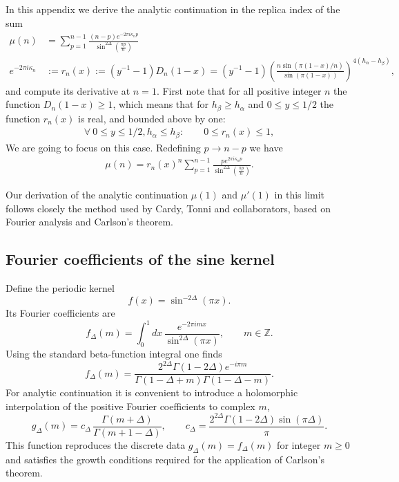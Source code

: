 \documentclass[11pt]{article}
\newcommand{\nn}{\nonumber}
\newcommand{\lb}{\left(}
\newcommand{\rb}{\right)}
\begin{document}
In this appendix we derive the analytic continuation in the replica index
of the sum
\begin{align}
\mu(n)&=\sum_{p=1}^{n-1}\frac{(n-p)e^{-2\pi i \kappa_n p}}{\sin^{2\Delta}\!\left(\frac{\pi p}{n}\right)}\nn\\
e^{-2\pi i \kappa_n}&:=r_n(x):=(y^{-1}-1)D_n(1-x)=(y^{-1}-1)\lb\frac{n\sin(\pi (1-x)/n)}{\sin(\pi (1-x))} \rb^{4(h_\alpha-h_\beta)},
\end{align}
and compute its derivative at $n=1$. First note that for all positive integer $n$ the function $D_n(1-x)\geq 1$, which means that for $h_\beta\geq h_\alpha$ and $0\leq y\leq 1/2$ the function $r_n(x)$ is real, and bounded above by one:
\begin{align}
  \forall\: 0\leq y\leq 1/2, h_\alpha\leq h_\beta: \qquad 0\leq r_n(x)\leq 1,   
\end{align}
We are going to focus on this case. Redefining $p\to n-p$ we have
\begin{align}
\mu(n)=r_n(x)^{n}\sum_{p=1}^{n-1}\frac{p e^{2\pi i \kappa_n p}}{\sin^{2\Delta}\left(\frac{\pi p}{n}\right)}.
\end{align}


Our derivation of the analytic continuation $\mu(1)$ and $\mu'(1)$ in this limit follows closely the
method used by Cardy, Tonni and collaborators\cite{calabrese2011entanglement}, based on Fourier analysis
and Carlson's theorem.

\subsection{Fourier coefficients of the sine kernel}

Define the periodic kernel
\begin{equation}
f(x)=\sin^{-2\Delta}(\pi x).
\end{equation}
Its Fourier coefficients are
\begin{equation}
f_\Delta(m)=\int_0^1 dx\,\frac{e^{-2\pi i m x}}{\sin^{2\Delta}(\pi x)},
\qquad m\in\mathbb Z .
\end{equation}
Using the standard beta-function integral one finds
\begin{equation}
f_\Delta(m)=
\frac{2^{2\Delta}\Gamma(1-2\Delta)e^{-i\pi m}}
{\Gamma(1-\Delta+m)\Gamma(1-\Delta-m)} .
\end{equation}
For analytic continuation it is convenient to introduce a holomorphic
interpolation of the positive Fourier coefficients to complex $m$,
\begin{equation}\label{eq: Fourier coeff of csc^2Delta}
g_\Delta(m)=c_\Delta\,\frac{\Gamma(m+\Delta)}{\Gamma(m+1-\Delta)},
\qquad
c_\Delta=\frac{2^{2\Delta}\Gamma(1-2\Delta)\sin(\pi\Delta)}{\pi}.
\end{equation}
This function reproduces the discrete data
\(
g_\Delta(m)=f_\Delta(m)
\)
for integer $m\ge0$ and satisfies the growth conditions required for the
application of Carlson's theorem.
\end{document}
